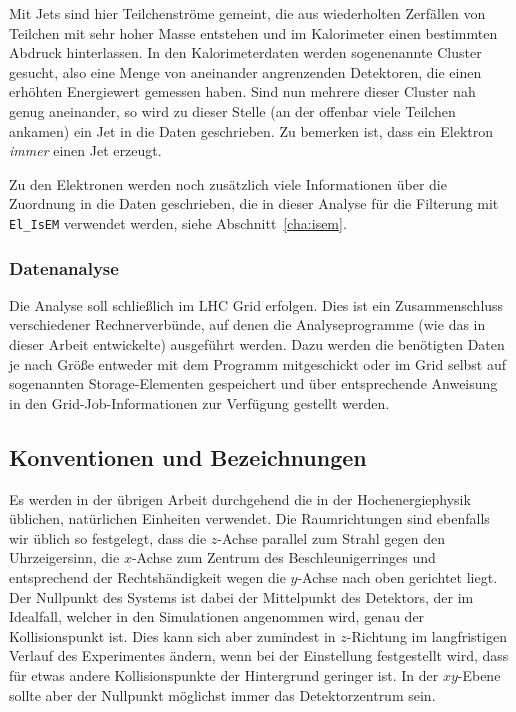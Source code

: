 Mit Jets sind hier Teilchenströme gemeint, die aus wiederholten Zerfällen von
Teilchen mit sehr hoher Masse entstehen und im Kalorimeter einen bestimmten
Abdruck hinterlassen. In den Kalorimeterdaten werden sogenenannte Cluster
gesucht, also eine Menge von aneinander angrenzenden Detektoren, die einen
erhöhten Energiewert gemessen haben. Sind nun mehrere dieser Cluster nah genug
aneinander, so wird zu dieser Stelle (an der offenbar viele Teilchen ankamen)
ein Jet in die Daten geschrieben. Zu bemerken ist, dass ein Elektron
\emph{immer} einen Jet erzeugt.

Zu den Elektronen werden noch zusätzlich viele Informationen über die Zuordnung
in die Daten geschrieben, die in dieser Analyse für die Filterung mit
\lstinline'El_IsEM' verwendet werden, siehe Abschnitt~\ref{cha:isem}.

\subsubsection{Datenanalyse}
Die Analyse soll schließlich im LHC Grid erfolgen. Dies ist ein Zusammenschluss
verschiedener Rechnerverbünde, auf denen die Analyseprogramme (wie das in dieser
Arbeit entwickelte) ausgeführt werden. Dazu werden die benötigten Daten je nach
Größe entweder mit dem Programm mitgeschickt oder im Grid selbst auf sogenannten
Storage-Elementen gespeichert und über entsprechende Anweisung in den
Grid-Job-Informationen zur Verfügung gestellt werden.

\subsection{Konventionen und Bezeichnungen}
\label{cha:conv}
Es werden in der übrigen Arbeit durchgehend die in der Hochenergiephysik
üblichen, natürlichen Einheiten verwendet. Die Raumrichtungen sind ebenfalls wir
üblich so festgelegt, dass die $z$-Achse parallel zum Strahl gegen den
Uhrzeigersinn, die $x$-Achse zum Zentrum des Beschleunigerringes und
entsprechend der Rechtshändigkeit wegen die $y$-Achse nach oben gerichtet liegt.
Der Nullpunkt des Systems ist dabei der Mittelpunkt des Detektors, der im
Idealfall, welcher in den Simulationen angenommen wird, genau der
Kollisionspunkt ist.  Dies kann sich aber zumindest in $z$-Richtung im
langfristigen Verlauf des Experimentes ändern, wenn bei der Einstellung
festgestellt wird, dass für etwas andere Kollisionspunkte der Hintergrund
geringer ist. In der $xy$-Ebene sollte aber der Nullpunkt möglichst immer das
Detektorzentrum sein.

